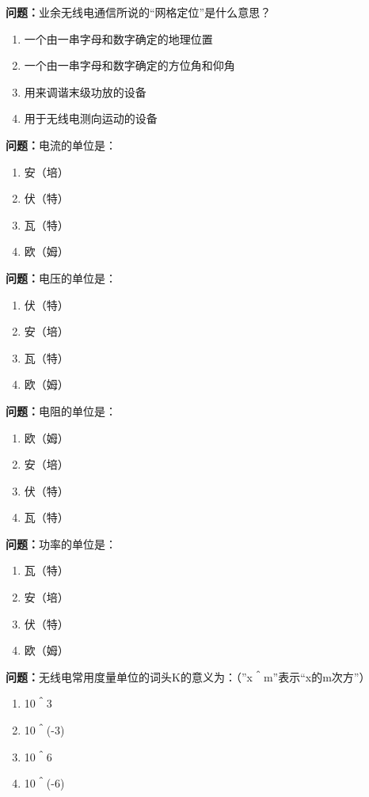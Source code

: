 \documentclass{ctexbook}
\begin{document}
\textbf{问题：}业余无线电通信所说的“网格定位”是什么意思？
\begin{enumerate}[label=\Alph*), leftmargin=3em]
\item 一个由一串字母和数字确定的地理位置
\item 一个由一串字母和数字确定的方位角和仰角
\item 用来调谐末级功放的设备
\item 用于无线电测向运动的设备
\end{enumerate}

\textbf{问题：}电流的单位是：
\begin{enumerate}[label=\Alph*), leftmargin=3em]
\item 安（培）
\item 伏（特）
\item 瓦（特）
\item 欧（姆）
\end{enumerate}

\textbf{问题：}电压的单位是：
\begin{enumerate}[label=\Alph*), leftmargin=3em]
\item 伏（特）
\item 安（培）
\item 瓦（特）
\item 欧（姆）
\end{enumerate}

\textbf{问题：}电阻的单位是：
\begin{enumerate}[label=\Alph*), leftmargin=3em]
\item 欧（姆）
\item 安（培）
\item 伏（特）
\item 瓦（特）
\end{enumerate}

\textbf{问题：}功率的单位是：
\begin{enumerate}[label=\Alph*), leftmargin=3em]
\item 瓦（特）
\item 安（培）
\item 伏（特）
\item 欧（姆）
\end{enumerate}

\textbf{问题：}无线电常用度量单位的词头K的意义为：（”x＾m”表示“x的m次方”）
\begin{enumerate}[label=\Alph*), leftmargin=3em]
\item 10＾3
\item 10＾(-3)
\item 10＾6
\item 10＾(-6)
\end{enumerate}
\end{document}
